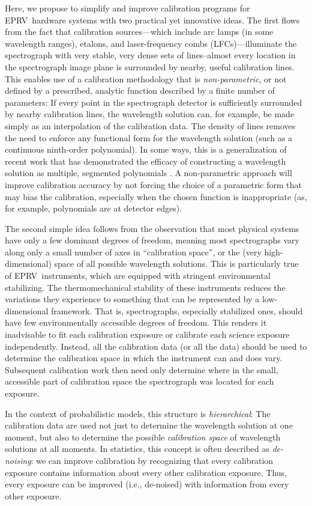 \documentclass[twocolumn,table,xcolor,trackchanges]{aastex63}
\newcommand{\acronym}[1]{{\small{#1}}}
\newcommand{\eprv}{\acronym{EPRV}}
\newcommand{\lfc}{\acronym{LFC}}
\begin{document}
Here, we propose to simplify and improve calibration programs for \eprv\ hardware systems with two practical yet innovative ideas.  The first flows from the fact that calibration sources---which include arc lamps (in some wavelength ranges), etalons, and laser-frequency combs (\lfc s)---illuminate the spectrograph with very stable, very dense sets of lines--almost every location in the spectrograph image plane is surrounded by nearby, useful calibration lines.  This enables use of a calibration methodology that is \emph{non-parametric}, or not defined by a prescribed, analytic function described by a finite number of parameters:  If every point in the spectrograph detector is sufficiently surrounded by nearby calibration lines, the wavelength solution can, for example, be made simply as an interpolation of the calibration data.  The density of lines removes the need to enforce any functional form for the wavelength solution (such as a continuous ninth-order polynomial).  In some ways, this is a generalization of recent work that has demonstrated the efficacy of constructing a wavelength solution as multiple, segmented polynomials \citep{milakovic2020}.  A non-parametric approach will improve calibration accuracy by not forcing the choice of a parametric form that may bias the calibration, especially when the chosen function is inappropriate (as, for example, polynomials are at detector edges).

The second simple idea follows from the observation that most physical systems have only a few dominant degrees of freedom, meaning most spectrographs vary along only a small number of axes in ``calibration space'', or the (very high-dimensional) space of all possible wavelength solutions.  This is particularly true of \eprv\ instruments, which are equipped with stringent environmental stabilizing.  The thermomechanical stability of these instruments reduces the variations they experience to something that can be represented by a low-dimensional framework.  That is, spectrographs, especially stabilized ones, should have few environmentally accessible degrees of freedom.  This renders it inadvisable to fit each calibration exposure or calibrate each science exposure independently.  Instead, all the calibration data (or all the data) should be used to determine the calibration space in which the instrument can and does vary.  Subsequent calibration work then need only determine where in the small, accessible part of calibration space the spectrograph was located for each exposure.

In the context of probabilistic models, this structure is \emph{hierarchical}:  The calibration data are used not just to determine the wavelength solution at one moment, but also to determine the possible \emph{calibration space} of wavelength solutions at all moments.  In statistics, this concept is often described as \emph{de-noising}:  we can improve calibration by recognizing that every calibration exposure contains information about every other calibration exposure.  Thus, every exposure can be improved (i.e., de-noised) with information from every other exposure.
\end{document}
